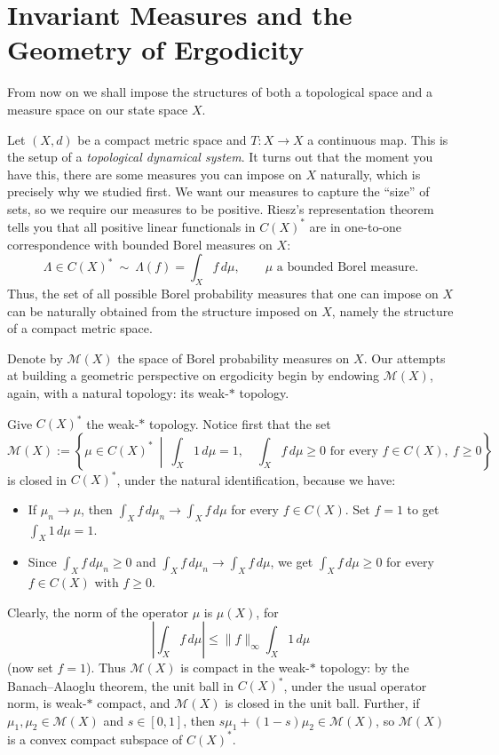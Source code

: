 \documentclass[11pt,a4paper]{article}
\begin{document}
\section*{Invariant Measures and the Geometry of Ergodicity}
From now on we shall impose the structures of both a topological space and a
measure space on our state space $X$.

Let $(X,d)$ be a compact metric space and $T\colon X\to X$ a continuous map.
This is the setup of a \emph{topological dynamical system}. It turns out that
the moment you have this, there are some measures you can impose on $X$
naturally, which is precisely why we studied  first.
We want our measures to capture the ``size'' of sets, so we require our
measures to be positive. Riesz's representation theorem tells you that all
positive linear functionals in $C(X)^*$ are in one-to-one correspondence with
bounded Borel measures on $X$:
\[
 \boxed{\Lambda\in C(X)^*\ \sim\ \Lambda(f)=\int_X f\,d\mu,
 \qquad \mu\text{ a bounded Borel measure}.}
\]
Thus, the set of all possible Borel probability measures that one can impose
on $X$ can be naturally obtained from the structure imposed on $X$, namely
the structure of a compact metric space.

Denote by $\mathcal M(X)$ the space of Borel probability measures on $X$. Our
attempts at building a geometric perspective on ergodicity begin by endowing
$\mathcal M(X)$, again, with a natural topology: its weak-$*$ topology.

Give $C(X)^*$ the weak-$*$ topology. Notice first that the set
\[
 \mathcal M(X):=\left\{\mu\in C(X)^*\ \middle|\
 \int_X1\,d\mu=1,\quad
 \int_Xf\,d\mu\geq0\text{ for every }f\in C(X),\ f\geq0\right\}
\]
is closed in $C(X)^*$, under the natural identification, because we have:
\begin{itemize}
 \item If $\mu_n\to\mu$, then $\int_X f\,d\mu_n\to\int_X f\,d\mu$ for every $f\in C(X)$. Set $f=1$ to get $\int_X1\,d\mu=1$.
 \item Since $\int_Xf\,d\mu_n\geq0$ and $\int_Xf\,d\mu_n\to\int_Xf\,d\mu$, we get $\int_Xf\,d\mu\geq0$ for every $f\in C(X)$ with $f\geq0$.
\end{itemize}
Clearly, the norm of the operator $\mu$ is $\mu(X)$, for
\[
 \left|\int_Xf\,d\mu\right|\leq\|f\|_\infty\int_X1\,d\mu
\]
(now set $f=1$). Thus $\mathcal M(X)$ is compact in the weak-$*$ topology: by the Banach--Alaoglu theorem, the unit ball in $C(X)^*$, under the usual operator norm, is weak-$*$ compact, and $\mathcal M(X)$ is closed in the unit ball. Further, if $\mu_1,\mu_2\in\mathcal M(X)$ and $s\in[0,1]$, then $s\mu_1+(1-s)\mu_2\in\mathcal M(X)$, so $\mathcal M(X)$ is a convex compact subspace of $C(X)^*$.
\end{document}
